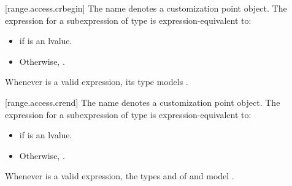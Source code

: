[range.access.crbegin]{}
\pnum
The name  denotes a customization point
object. The expression
 for a subexpression  of type
 is expression-equivalent to:
\begin{itemize}
\item {} if  is
  an lvalue.
\item Otherwise, .
\end{itemize}

\pnum
\begin{note}
Whenever  is a valid expression, its
type models .
\end{note}

[range.access.crend]{}
\pnum
The name  denotes a customization point
object. The expression
 for a subexpression  of type 
is expression-equivalent to:
\begin{itemize}
\item {} if  is an lvalue.

\item Otherwise, .
\end{itemize}

\pnum
\begin{note}
Whenever  is a valid expression,
the types  and  of
 and 
model .
\end{note}

